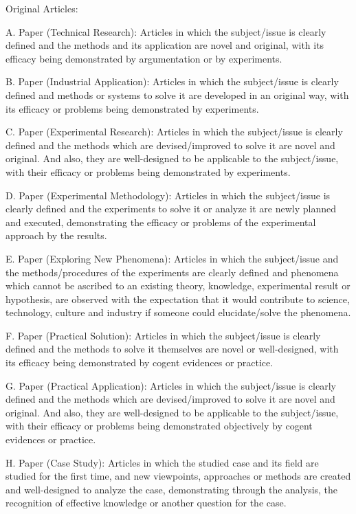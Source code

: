 \documentclass[a4paper,10pt,conference,compsoc]{ISASE}
\begin{document}
Original Articles:

A. Paper (Technical Research): Articles in which the subject/issue is clearly
defined and the methods and its application are novel and original, with its
efficacy being demonstrated by argumentation or by experiments.

B. Paper (Industrial Application): Articles in which the subject/issue is
clearly defined and methods or systems to solve it are developed in an original
way, with its efficacy or problems being demonstrated by experiments.

C. Paper (Experimental Research): Articles in which the subject/issue is
clearly defined and the methods which are devised/improved to solve it are
novel and original. And also, they are well-designed to be applicable to the
subject/issue, with their efficacy or problems being demonstrated by
experiments.

D. Paper (Experimental Methodology): Articles in which the subject/issue is
clearly defined and the experiments to solve it or analyze it are newly planned
and executed, demonstrating the efficacy or problems of the experimental
approach by the results.

E. Paper (Exploring New Phenomena): Articles in which the subject/issue and the
methods/procedures of the experiments are clearly defined and phenomena which
cannot be ascribed to an existing theory, knowledge, experimental result or
hypothesis, are observed with the expectation that it would contribute to
science, technology, culture and industry if someone could elucidate/solve the
phenomena.

F. Paper (Practical Solution): Articles in which the subject/issue is clearly
defined and the methods to solve it themselves are novel or well-designed, with
its efficacy being demonstrated by cogent evidences or practice.

G. Paper (Practical Application): Articles in which the subject/issue is
clearly defined and the methods which are devised/improved to solve it are
novel and original. And also, they are well-designed to be applicable to the
subject/issue, with their efficacy or problems being demonstrated objectively
by cogent evidences or practice.

H. Paper (Case Study): Articles in which the studied case and its field are
studied for the first time, and new viewpoints, approaches or methods are
created and well-designed to analyze the case, demonstrating through the
analysis, the recognition of effective knowledge or another question for the
case.
\end{document}
